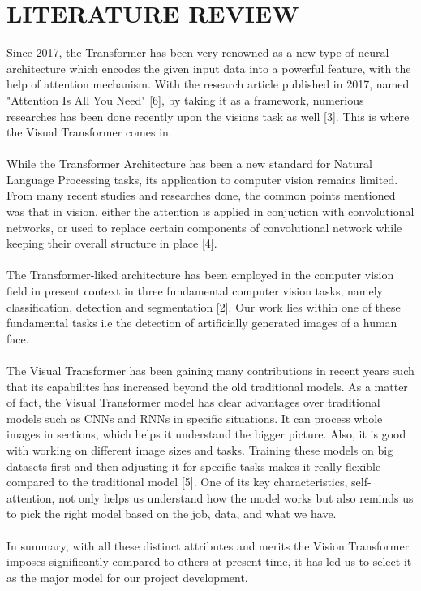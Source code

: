 \section{LITERATURE REVIEW}
Since 2017, the Transformer has been very renowned as a new type of neural architecture which encodes the given input data into a powerful feature, with the help of attention mechanism.  With the research article published in 2017, named "Attention Is All You Need" [6], by taking it as a framework, numerious researches has been done recently upon the visions task as well [3]. This is where the Visual Transformer comes in. 
\\\\
While the Transformer Architecture has been a new standard for Natural Language Processing tasks, its application to computer vision remains limited. From many recent studies and researches done, the common points mentioned was that in vision, either the attention is applied in conjuction with convolutional networks, or used to replace certain components of convolutional network while keeping their overall structure in place [4].
\\\\
The Transformer-liked architecture has been employed in the computer vision field in present context in three fundamental computer vision tasks, namely classification, detection and segmentation [2]. Our work lies within one of these fundamental tasks i.e the detection of artificially generated images of a human face.
\\\\
 The Visual Transformer has been gaining many contributions in recent years such that its capabilites has increased beyond the old traditional models. As a matter of fact, the Visual Transformer model has clear advantages over traditional models such as CNNs and RNNs in specific situations. It can process whole images in sections, which helps it understand the bigger picture. Also, it is good with working on different image sizes and tasks. 
 Training these models on big datasets first and then adjusting it for specific tasks makes it really flexible compared to the traditional model [5]. 
 One of its key characteristics, self-attention, not only helps us understand how the model works but also reminds us to pick the right model based on the job, data, and what we have.
\\\\
In summary, with all these distinct attributes and merits the Vision Transformer imposes significantly compared to others at present time, it has led us to select it as the major model for our project development.

